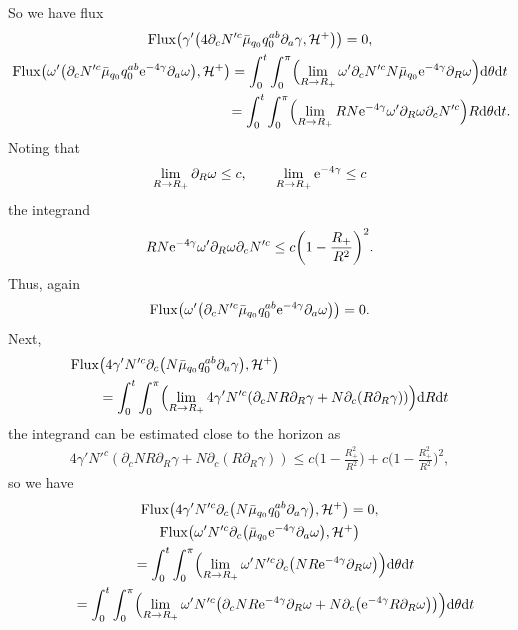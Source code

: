 \documentclass[pdftex]{sigma}
\def\ptl{\partial}%
\numberwithin{equation}{section}
\begin{document}
So we have flux
\begin{gather*}
{\rm Flux} \bigl(\gamma' \bigl(4 \ptl_c N'^c \bar{\mu}_{q_0} q^{ab} _0 \ptl_a \gamma, \mathcal{H}^+\bigr)\bigr) =0,
\\
{\rm Flux} \bigl(\omega' \bigl(\ptl_c N'^c \bar{\mu}_{q_0} q^{ab} _0 {\rm e}^{-4 \gamma} \ptl_a \omega\bigr), \mathcal{H}^+\bigr)
= \int^t_0 \int^\pi_0 \Bigl(\lim_{R \to R_+} \omega' \ptl_c N'^c N \bar{\mu}_{q_0} {\rm e}^{-4\gamma} \ptl_R \omega\Bigr) {\rm d} \theta {\rm d}t \notag\\
\hphantom{{\rm Flux} \bigl(\omega' \bigl(\ptl_c N'^c \bar{\mu}_{q_0} q^{ab} _0 {\rm e}^{-4 \gamma} \ptl_a \omega\bigr), \mathcal{H}^+\bigr)}{}
= \int^t_0 \int^\pi_0 \Bigl(\lim_{R \to R_+} R N {\rm e}^{-4\gamma} \omega' \ptl_R \omega \ptl_c N'^c\Bigr)R {\rm d}\theta {\rm d}t.
\end{gather*}
Noting that
\begin{align*}
\lim_{R \to R_+} \ptl_R \omega \leq c, \qquad \lim_{R \to R_+} {\rm e}^{-4\gamma} \leq c
\end{align*}
the integrand
\begin{align*}
R N {\rm e}^{-4\gamma} \omega' \ptl_R \omega \ptl_c N'^c \leq c \biggl(1- \frac{R_+}{R^2}\biggr)^2.
\end{align*}
Thus, again
\begin{align*}
{\rm Flux} \bigl(\omega' \bigl(\ptl_c N'^c \bar{\mu}_{q_0} q^{ab} _0 {\rm e}^{-4 \gamma} \ptl_a \omega\bigr)\bigr) =0.
\end{align*}
Next,
\begin{align*}
& {\rm Flux} \bigl(4\gamma' N'^c\ptl_c \bigl(N \bar{\mu}_{q_0} q^{ab}_0 \ptl_a \gamma\bigr), \mathcal{H}^+\bigr) \notag \\
&\qquad{}= \int^t_0 \int^\pi_0 \Bigl(\lim_{R \to R_+} 4 \gamma' N'^c (\ptl_c N R \ptl_R \gamma + N \ptl_c (R \ptl_R \gamma) ) \Bigr) {\rm d}R {\rm d}t
\end{align*}
the integrand can be estimated close to the horizon as
\begin{align*}
4 \gamma' N'^c (\ptl_c N R \ptl_R \gamma + N \ptl_c (R \ptl_R \gamma) ) \leq c \biggl(1- \frac{R^2_+}{R^2}\biggr) + c \biggl(1- \frac{R^2_+}{R^2}\biggr)^2,
\end{align*}
so we have
\begin{gather*}
{\rm Flux} \bigl(4\gamma' N'^c\ptl_c \bigl(N \bar{\mu}_{q_0} q^{ab}_0 \ptl_a \gamma\bigr), \mathcal{H}^+\bigr) =0,
\\
{\rm Flux} \bigl(\omega' N'^c \ptl_c \bigl(\bar{\mu}_{q_0} {\rm e}^{-4\gamma} \ptl_a \omega\bigr), \mathcal{H}^+\bigr) \notag\\
\qquad{}=
\int^t_0 \int^\pi_0 \Bigl(\lim_{R \to R_+} \omega' N'^c \ptl_c\bigl(N R {\rm e}^{-4\gamma} \ptl_R \omega\bigr) \Bigr) {\rm d}\theta {\rm d}t \notag\\
\qquad{}= \int^t_0 \int^\pi_0 \Bigl(\lim_{R \to R_+} \omega' N'^c \bigl(\ptl_c N R {\rm e}^{-4\gamma} \ptl_R \omega + N \ptl_c \bigl({\rm e}^{-4\gamma} R \ptl_R \omega\bigr)\bigr) \Bigr) {\rm d} \theta {\rm d}t
\end{gather*}
\end{document}
